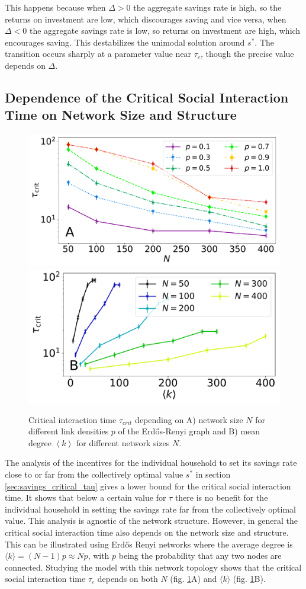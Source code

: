 This happens because when $\Delta > 0$ the aggregate savings rate is high, so the returns on investment are low, which discourages saving and vice versa, when $\Delta < 0$ the aggregate savings rate is low, so returns on investment are high, which encourages saving. 
This destabilizes the unimodal solution around $s^\ast$. 
The transition occurs sharply at a parameter value near $\tau_{c}$, though the precise value depends on $\Delta$.
\newpage
\subsection{Dependence of the Critical Social Interaction Time on Network Size and Structure}  
\label{sec:savings_network_structure}

\begin{figure}
  \centering
  \includegraphics[width = .6 \textwidth]{figures/taucrit_N2.pdf}
  \includegraphics[width = .6 \textwidth]{figures/taucrit_N_k.pdf}
\caption{Critical interaction time $\tau_{crit}$ depending on A) network size $N$ for different link densities $p$ of the Erd\H{o}s-Renyi graph and B) mean degree $\left< k \right>$ for different network sizes $N$.}
  \label{fig:taucrit}
\end{figure}
The analysis of the incentives for the individual household to set its savings rate close to or far from the collectively optimal value $s^*$ in section \ref{sec:savings_critical_tau} gives a lower bound for the critical social interaction time. It shows that below a certain value for $\tau$ there is no benefit for the individual household in setting the savings rate far from the collectively optimal value. 
This analysis is agnostic of the network structure. However, in general the critical social interaction time also depends on the network size and structure. 
This can be illustrated using Erd\H{o}s Renyi networks where the average degree is $\langle k \rangle = (N-1)p \approx Np$, with $p$ being the probability that any two nodes are connected. Studying the model with this network topology shows that the critical social interaction time $\tau_{c}$ depends on both $N$ (fig. \ref{fig:taucrit}A) and $\langle k \rangle$ (fig. \ref{fig:taucrit}B). 

